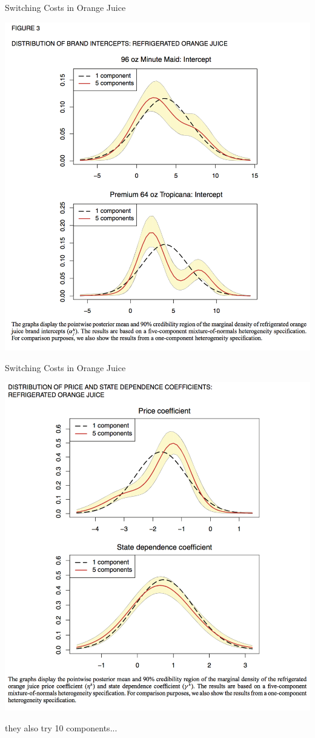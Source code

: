 \documentclass[xcolor=pdftex,dvipsnames,table,mathserif,aspectratio=169]{beamer}
\begin{document}
\begin{frame}{Switching Costs in Orange Juice}
\begin{center}
\includegraphics[scale=0.33]{resources/OJ_F3.png}
\end{center}
\end{frame}

\begin{frame}{Switching Costs in Orange Juice}
\begin{center}
\includegraphics[scale=0.33]{resources/OJ_F4.png}
\end{center}
they also try 10 components...
\end{frame}
\end{document}
